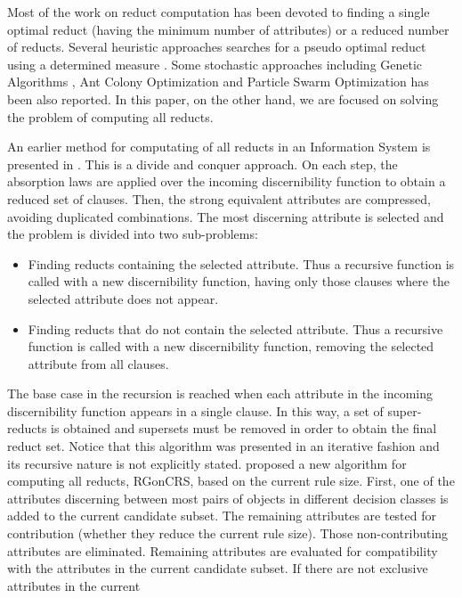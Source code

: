 \documentclass[authoryear,preprint,review,12pt]{elsarticle}
\begin{document}
  Most of the work on reduct computation has been devoted to finding a single optimal reduct (having the minimum 
  number of attributes) or a reduced number of reducts. Several heuristic approaches searches for a pseudo optimal
  reduct using a determined measure \citep{Chouchoulas01,Ohrn00}. Some stochastic approaches including Genetic
  Algorithms \citep{Wroblewski95}, Ant Colony Optimization \citep{Jensen03,Chen10} and Particle Swarm Optimization 
  \citep{Wang07} has been also reported. In this paper, on the other hand, we are focused on solving the problem
  of computing all reducts.
  
  An earlier method for computating of all reducts in an Information System is presented in
  \citep{Starzyk99,Starzyk00}.
  This is a divide and conquer approach. On each step, the absorption laws are applied over the incoming
  discernibility function to obtain a reduced set of clauses. Then, the strong equivalent attributes are 
  compressed, avoiding duplicated combinations. The most discerning attribute is selected and the problem 
  is divided into two sub-problems: 
  \begin{itemize}
  \item Finding reducts containing the selected attribute. Thus a recursive function is called with a new 
  discernibility function, having only those clauses where the selected attribute does not appear.
  \item Finding reducts that do not contain the selected attribute. Thus a recursive function is called with 
  a new discernibility function, removing the selected attribute from all clauses.
  \end{itemize}
  The base case in the recursion is reached when each attribute in the incoming discernibility function appears 
  in a single clause. In this way, a set of super-reducts is obtained and supersets must be removed in order 
  to obtain the final reduct set. Notice that this algorithm was presented in an iterative fashion and its 
  recursive nature is not explicitly stated.  
  \cite{WangP07} proposed a new algorithm for computing all reducts, RGonCRS, based on the current rule size. 
  First, one of the attributes discerning between most pairs of objects in different decision classes is added 
  to the current candidate subset. 
  The remaining attributes are tested for contribution (whether they reduce the current rule
  size). Those non-contributing attributes are eliminated. Remaining attributes are evaluated for compatibility 
  with the attributes in the current candidate subset. If there are not exclusive attributes in the current
\end{document}

